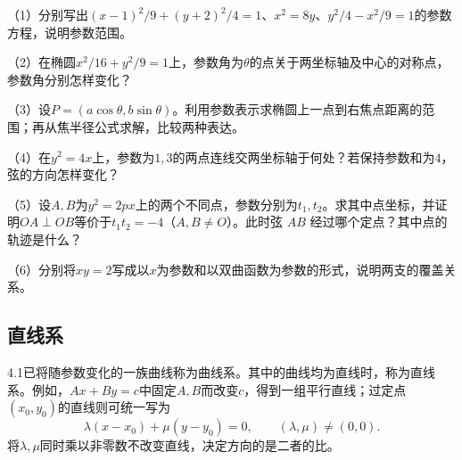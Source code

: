 \begin{exercise}
\mbox{}\par\nobreak

\begin{samepage}
（1）分别写出\((x-1)^2/9+(y+2)^2/4=1\)、\(x^2=8y\)、\(y^2/4-x^2/9=1\)的参数方程，说明参数范围。
\par
\end{samepage}

\begin{samepage}
（2）在椭圆\(x^2/16+y^2/9=1\)上，参数角为\(\theta\)的点关于两坐标轴及中心的对称点，参数角分别怎样变化？
\par
\end{samepage}

\begin{samepage}
（3）设\(P=(a\cos\theta,b\sin\theta)\)。利用参数表示求椭圆上一点到右焦点距离的范围；再从焦半径公式求解，比较两种表达。
\par
\end{samepage}

\begin{samepage}
（4）在\(y^2=4x\)上，参数为\(1,3\)的两点连线交两坐标轴于何处？若保持参数和为\(4\)，弦的方向怎样变化？
\par
\end{samepage}

\begin{samepage}
（5）设\(A,B\)为\(y^2=2px\)上的两个不同点，参数分别为\(t_1,t_2\)。求其中点坐标，并证明\(OA\perp OB\)等价于\(t_1t_2=-4\)（\(A,B\ne O\)）。此时弦 \(AB\) 经过哪个定点？其中点的轨迹是什么？
\par
\end{samepage}

\begin{samepage}
（6）分别将\(xy=2\)写成以\(x\)为参数和以双曲函数为参数的形式，说明两支的覆盖关系。
\par
\end{samepage}

\end{exercise}

\subsection{直线系}
\label{subsec:quadratic-line-families}

4.1已将随参数变化的一族曲线称为曲线系。其中的曲线均为直线时，称为{\heiti{}直线系}。例如，\(Ax+By=c\)中固定\(A,B\)而改变\(c\)，得到一组平行直线；过定点\((x_0,y_0)\)的直线则可统一写为
\begin{equation*}
    \lambda(x-x_0)+\mu(y-y_0)=0,
    \qquad (\lambda,\mu)\ne(0,0) .
\end{equation*}
将\(\lambda,\mu\)同时乘以非零数不改变直线，决定方向的是二者的比。

